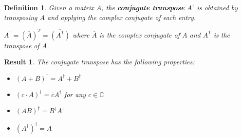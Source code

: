 \documentclass[12pt,twoside,fleqn]{report}
\theoremstyle{thmstyle}
\newtheorem{defn}{Definition}[chapter]
\newtheorem{result}{Result}[chapter]
\begin{document}
\begin{defn}
    Given a matrix $A$, the \textbf{conjugate transpose} $A^\dagger$ is obtained by transposing $A$ and applying the complex conjugate of each entry.

    $A^\dagger = (\overline{A})^T = \overline{(A^T)}$ where $\overline{A}$ is the complex conjugate of $A$ and $A^T$ is the transpose of $A$.
\end{defn}

\begin{result}
    The conjugate transpose has the following properties:
    \begin{itemize}
        \item $(A + B)^\dagger = A^\dagger + B^\dagger$
        \item $(c \cdot A)^\dagger = \overline{c} A^\dagger$ for any $c \in \mathbb{C}$
        \item $(AB)^\dagger = B^\dagger A^\dagger$
        \item $(A^\dagger)^\dagger = A$
    \end{itemize}
\end{result}
\end{document}
